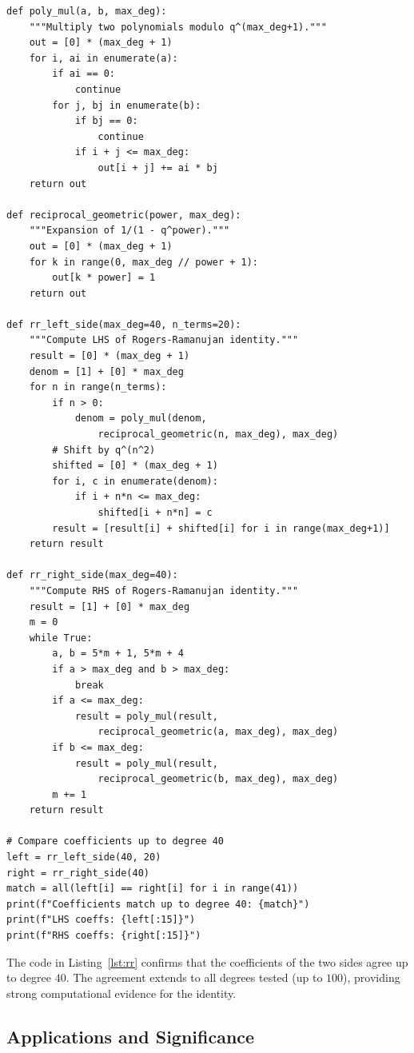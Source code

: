 \documentclass[10pt]{amsart}
\theoremstyle{plain}
\theoremstyle{definition}
\theoremstyle{remark}
\begin{document}
\begin{lstlisting}[label=lst:rr, caption={Verifying the Rogers--Ramanujan identity by comparing power series coefficients.}]
def poly_mul(a, b, max_deg):
    """Multiply two polynomials modulo q^(max_deg+1)."""
    out = [0] * (max_deg + 1)
    for i, ai in enumerate(a):
        if ai == 0:
            continue
        for j, bj in enumerate(b):
            if bj == 0:
                continue
            if i + j <= max_deg:
                out[i + j] += ai * bj
    return out

def reciprocal_geometric(power, max_deg):
    """Expansion of 1/(1 - q^power)."""
    out = [0] * (max_deg + 1)
    for k in range(0, max_deg // power + 1):
        out[k * power] = 1
    return out

def rr_left_side(max_deg=40, n_terms=20):
    """Compute LHS of Rogers-Ramanujan identity."""
    result = [0] * (max_deg + 1)
    denom = [1] + [0] * max_deg
    for n in range(n_terms):
        if n > 0:
            denom = poly_mul(denom,
                reciprocal_geometric(n, max_deg), max_deg)
        # Shift by q^(n^2)
        shifted = [0] * (max_deg + 1)
        for i, c in enumerate(denom):
            if i + n*n <= max_deg:
                shifted[i + n*n] = c
        result = [result[i] + shifted[i] for i in range(max_deg+1)]
    return result

def rr_right_side(max_deg=40):
    """Compute RHS of Rogers-Ramanujan identity."""
    result = [1] + [0] * max_deg
    m = 0
    while True:
        a, b = 5*m + 1, 5*m + 4
        if a > max_deg and b > max_deg:
            break
        if a <= max_deg:
            result = poly_mul(result,
                reciprocal_geometric(a, max_deg), max_deg)
        if b <= max_deg:
            result = poly_mul(result,
                reciprocal_geometric(b, max_deg), max_deg)
        m += 1
    return result

# Compare coefficients up to degree 40
left = rr_left_side(40, 20)
right = rr_right_side(40)
match = all(left[i] == right[i] for i in range(41))
print(f"Coefficients match up to degree 40: {match}")
print(f"LHS coeffs: {left[:15]}")
print(f"RHS coeffs: {right[:15]}")
\end{lstlisting}

The code in Listing~\ref{lst:rr} confirms that the coefficients of the
two sides agree up to degree $40$. The agreement extends to all degrees
tested (up to $100$), providing strong computational evidence for the
identity.

\subsection{Applications and Significance}
\end{document}
